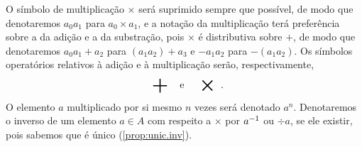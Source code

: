 \begin{notation}
O símbolo de multiplicação $\times$ será suprimido sempre que possível, de modo que denotaremos $a_0a_1$ para $a_0 \times a_1$, e a notação da multiplicação terá preferência sobre a da adição e a da substração, pois $\times$ é distributiva sobre $+$, de modo que denotaremos $a_0a_1 + a_2$ para $(a_1a_2) + a_3$ e $-a_1a_2$ para $-(a_1a_2)$. Os símbolos operatórios relativos à adição e à multiplicação serão, respectivamente,
	\begin{equation*}
	\sum \e \bigtimes.
	\end{equation*}
O elemento $a$ multiplicado por si mesmo $n$ vezes será denotado $a^n$. Denotaremos o inverso de um elemento $a \in A$ com respeito a $\times$ por $a^{-1}$ ou $\div a$, se ele existir, pois sabemos que é único (\ref{prop:unic.inv}).
\end{notation}


